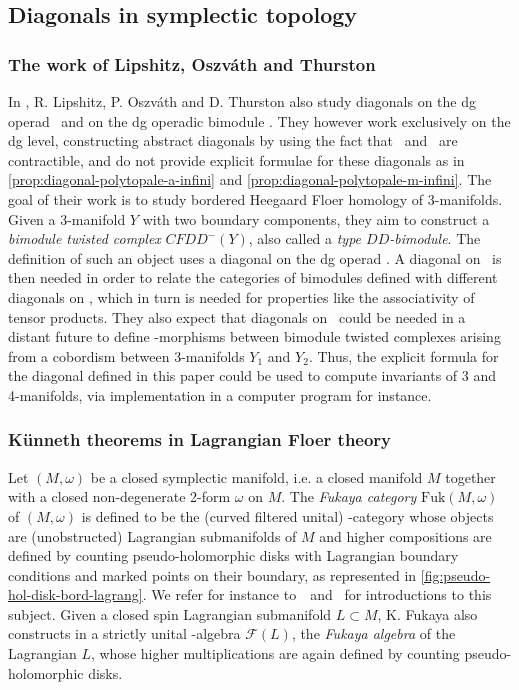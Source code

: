 \documentclass[10pt]{amsart}
\theoremstyle{remark}
\begin{document}
\subsection{Diagonals in symplectic topology} \label{ss:diag-symp}

\subsubsection{The work of Lipshitz, {Oszv\'ath} and Thurston}

In \cite{LOT20}, R. Lipshitz, P. Oszv\'ath and D. Thurston also study diagonals on the dg operad \Ainf\ and on the dg operadic bimodule \Minf . They however work exclusively on the dg level, constructing abstract diagonals by using the fact that \Ainf\ and \Minf\ are contractible, and do not provide explicit formulae for these diagonals as in \cref{prop:diagonal-polytopale-a-infini} and \cref{prop:diagonal-polytopale-m-infini}. The goal of their work is to study bordered Heegaard Floer homology of 3-manifolds.
Given a 3-manifold $Y$ with two boundary components, they aim to construct a \emph{bimodule twisted complex} $CFDD^-(Y)$, also called a \emph{type $DD$-bimodule}. The definition of such an object uses a diagonal on the dg operad \Ainf . A diagonal on \Minf\ is then needed in order to relate the categories of bimodules defined with different diagonals on \Ainf , which in turn is needed for properties like the associativity of tensor products. They also expect that diagonals on \Minf\ could be needed in a distant future to define \Ainf -morphisms between bimodule twisted complexes arising from a cobordism between 3-manifolds $Y_1$ and $Y_2$.
Thus, the explicit formula for the diagonal defined in this paper could be used to compute invariants of 3 and 4-manifolds, via implementation in a computer program for instance.

\subsubsection{K\"unneth theorems in Lagrangian Floer theory}
\label{sss:amorim-fukaya}

Let $(M,\omega)$ be a closed symplectic manifold, i.e. a closed manifold $M$ together with a closed non-degenerate 2-form $\omega$ on $M$. 
The \emph{Fukaya category} $\mathrm{Fuk}(M,\omega)$ of $(M,\omega)$ is defined to be the (curved filtered unital) \Ainf -category whose objects are (unobstructed) Lagrangian submanifolds of $M$ and higher compositions are defined by counting pseudo-holomorphic disks with Lagrangian boundary conditions and marked points on their boundary, as represented in \cref{fig:pseudo-hol-disk-bord-lagrang}. 
We refer for instance to~\cite{smith-prolegomenon}~and~\cite{auroux-fukaya} for introductions to this subject.
Given a closed spin Lagrangian submanifold $L \subset M$, K. Fukaya also constructs in \cite{fukaya-cyclic-symmetry} a strictly unital \Ainf -algebra $\mathcal{F}(L)$, the \emph{Fukaya algebra} of the Lagrangian $L$, whose higher multiplications are again defined by counting pseudo-holomorphic disks. 
\end{document}
